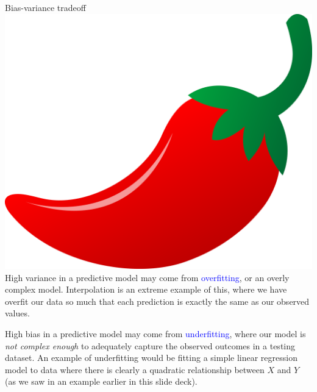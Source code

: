 \documentclass[10pt,t]{beamer}
\begin{document}
\begin{frame}{Bias-variance tradeoff \includegraphics[scale=0.01]{figures/chilipepper.png}}
High variance in a predictive model may come from \textcolor{blue}{overfitting}, or an overly complex model. Interpolation is an extreme example of this, where we have overfit our data so much that each prediction is exactly the same as our observed values.

\vspace{0.3cm}

High bias in a predictive model may come from \textcolor{blue}{underfitting}, where our model is \textit{not complex enough} to adequately capture the observed outcomes in a testing dataset. An example of underfitting would be fitting a simple linear regression model to data where there is clearly a quadratic relationship between $X$ and $Y$ (as we saw in an example earlier in this slide deck).

\end{frame}
\end{document}
